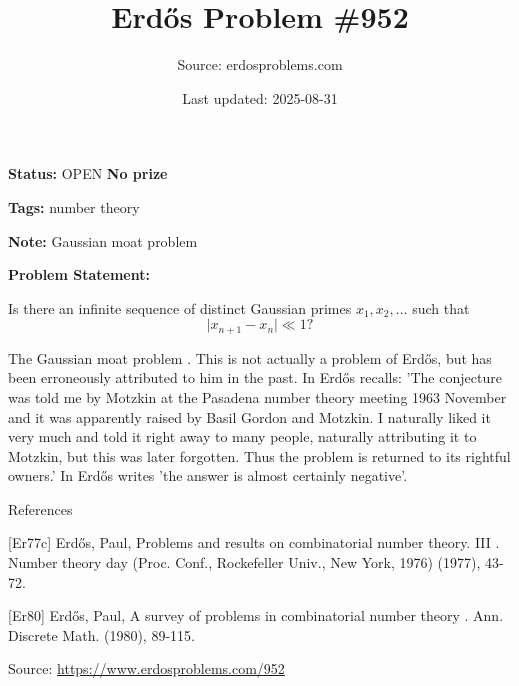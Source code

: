 \documentclass{article}
\title{Erd\H{o}s Problem \#952}
\date{Last updated: 2025-08-31}
\author{Source: erdosproblems.com}
\begin{document}
\maketitle

\noindent\textbf{Status:} OPEN \quad \textbf{No prize}

\noindent\textbf{Tags:} number theory

\medskip
\noindent\textbf{Note:} Gaussian moat problem

\medskip

\noindent\textbf{Problem Statement:}

Is there an infinite sequence of distinct Gaussian primes $x_1,x_2,\ldots$ such that\[\lvert x_{n+1}-x_n\rvert \ll 1?\]




The Gaussian moat problem . This is not actually a problem of Erd\H{o}s, but has been erroneously attributed to him in the past. In \cite{Er77c} Erd\H{o}s recalls: 'The conjecture was told me by Motzkin at the Pasadena number theory meeting 1963 November and it was apparently raised by Basil Gordon and Motzkin. I naturally liked it very much and told it right away to many people, naturally attributing it to Motzkin, but this was later forgotten. Thus the problem is returned to its rightful owners.' In \cite{Er80} Erd\H{o}s writes 'the answer is almost certainly negative'.




References

[Er77c] Erd\H{o}s, Paul, Problems and results on combinatorial number theory. III . Number theory day (Proc. Conf., Rockefeller Univ., New York, 1976) (1977), 43-72.

[Er80] Erd\H{o}s, Paul, A survey of problems in combinatorial number theory . Ann. Discrete Math. (1980), 89-115.


\bigskip
\noindent\small{Source: \url{https://www.erdosproblems.com/952}}
\end{document}
